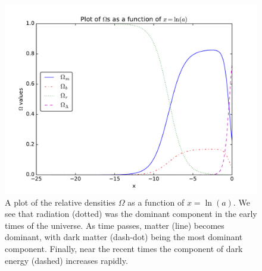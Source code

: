 \documentclass[12pt]{article}
\begin{document}
\begin{figure}[hbtp]
\centering
\includegraphics[width=\linewidth]{Plots/Omegas.pdf}
\caption{A plot of the relative densities $\Omega$ as a function of $x=\ln(a)$. We see that radiation (dotted) was the dominant component in the early times of the universe. As time passes, matter (line) becomes dominant, with dark matter (dash-dot) being the most dominant component. Finally, near the recent times the component of dark energy (dashed) increases rapidly.}
\end{figure}
\end{document}
